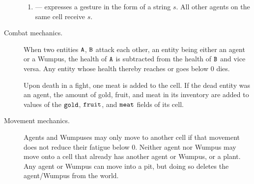 \begin{definition}
\begin{description}
\begin{enumerate}
		\item[\action{gesture}] --- expresses a gesture in the form of a string $s$. All other agents on the same cell receive $s$.
	\end{enumerate}
	
	\item[Combat mechanics.] When two entities $\mathtt{A}$, $\mathtt{B}$ attack each other, an entity being either an agent or a Wumpus, the health of $\mathtt{A}$ is subtracted from the health of $\mathtt{B}$ and vice versa. Any entity whose health thereby reaches or goes below 0 dies.
	
	Upon death in a fight, one meat is added to the cell. If the dead entity was an agent, the amount of gold, fruit, and meat in its inventory are added to values of the $\mathtt{gold}$, $\mathtt{fruit}$, and $\mathtt{meat}$ fields of its cell.
	
	\item[Movement mechanics.] Agents and Wumpuses may only move to another cell if that movement does not reduce their fatigue below 0. Neither agent nor Wumpus may move onto a cell that already has another agent or Wumpus, or a plant. Any agent or Wumpus can move into a pit, but doing so deletes the agent/Wumpus from the world.
	
\end{description}
\end{definition}

